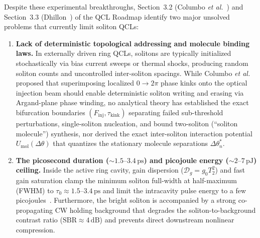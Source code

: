 \documentclass[11pt,letterpaper]{article}
\begin{document}
Despite these experimental breakthroughs, Section~3.2 (Columbo \textit{et al.}~\cite{ColumboRoadmap2025}) and Section~3.3 (Dhillon~\cite{DhillonRoadmap2025}) of the QCL Roadmap identify two major unsolved problems that currently limit soliton QCLs:
\begin{enumerate}
    \item \textbf{Lack of deterministic topological addressing and molecule binding laws.} In externally driven ring QCLs, solitons are typically initialized stochastically via bias current sweeps or thermal shocks, producing random soliton counts and uncontrolled inter-soliton spacings. While Columbo \textit{et al.}~\cite{ColumboRoadmap2025} proposed that superimposing localized $0 \to 2\pi$ phase kinks onto the optical injection beam should enable deterministic soliton writing and erasing via Argand-plane phase winding, no analytical theory has established the exact bifurcation boundaries $(F_{\mathrm{inj}}, \tau_{\mathrm{kink}})$ separating failed sub-threshold perturbations, single-soliton nucleation, and bound two-soliton (``soliton molecule'') synthesis, nor derived the exact inter-soliton interaction potential $U_{\mathrm{mol}}(\Delta\theta)$ that quantizes the stationary molecule separations $\Delta\theta_n^*$.
    \item \textbf{The picosecond duration ($\sim 1.5\text{--}3.4\,\mathrm{ps}$) and picojoule energy ($\sim 2\text{--}7\,\mathrm{pJ}$) ceiling.} Inside the active ring cavity, gain dispersion ($\mathcal{D}_g = g_0 T_2^2$) and fast gain saturation clamp the minimum soliton full-width at half-maximum (FWHM) to $\tau_0 \approx 1.5\text{--}3.4\,\mathrm{ps}$ and limit the intracavity pulse energy to a few picojoules~\cite{Meng2022,Kazakov2025,DhillonRoadmap2025}. Furthermore, the bright soliton is accompanied by a strong co-propagating CW holding background that degrades the soliton-to-background contrast ratio ($\mathrm{SBR} \approx 4\,\mathrm{dB}$) and prevents direct downstream nonlinear compression.
\end{enumerate}
\end{document}
